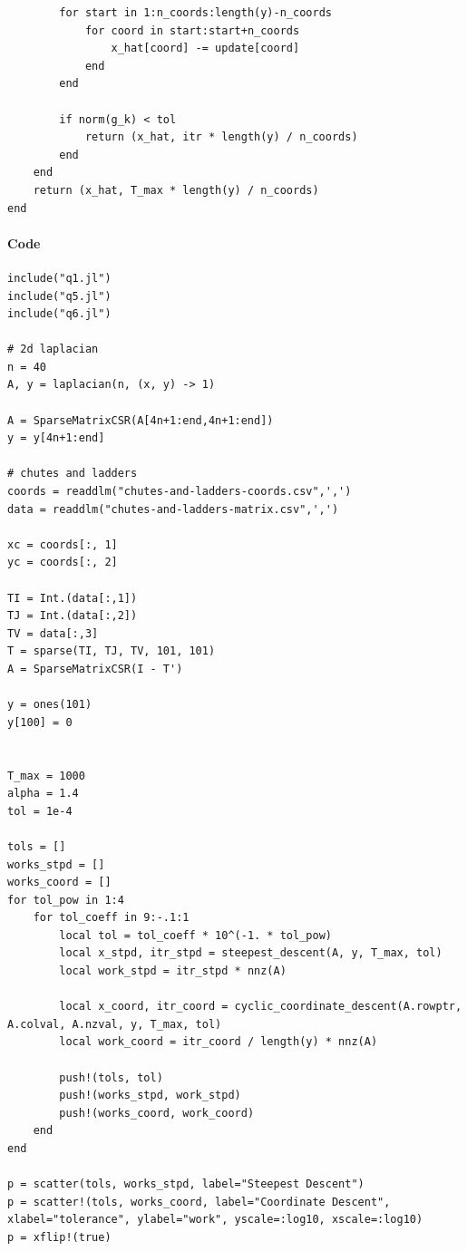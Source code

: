 \documentclass[]{exam}
\let\oldparagraph\paragraph
\renewcommand{\paragraph}[1]{\oldparagraph{#1}\mbox{}}
\begin{document}
\begin{questions}
\begin{lstlisting}
		for start in 1:n_coords:length(y)-n_coords
			for coord in start:start+n_coords
				x_hat[coord] -= update[coord]
			end
		end

		if norm(g_k) < tol
			return (x_hat, itr * length(y) / n_coords)
		end
	end
	return (x_hat, T_max * length(y) / n_coords)
end
\end{lstlisting}

\newpage
\question
\hfill

\paragraph{Code}
\begin{lstlisting}
include("q1.jl")
include("q5.jl")
include("q6.jl")

# 2d laplacian
n = 40
A, y = laplacian(n, (x, y) -> 1)

A = SparseMatrixCSR(A[4n+1:end,4n+1:end])
y = y[4n+1:end]

# chutes and ladders
coords = readdlm("chutes-and-ladders-coords.csv",',')
data = readdlm("chutes-and-ladders-matrix.csv",',')

xc = coords[:, 1]
yc = coords[:, 2]

TI = Int.(data[:,1])
TJ = Int.(data[:,2])
TV = data[:,3]
T = sparse(TI, TJ, TV, 101, 101)
A = SparseMatrixCSR(I - T')

y = ones(101)
y[100] = 0


T_max = 1000
alpha = 1.4
tol = 1e-4

tols = []
works_stpd = []
works_coord = []
for tol_pow in 1:4
	for tol_coeff in 9:-.1:1
		local tol = tol_coeff * 10^(-1. * tol_pow)
		local x_stpd, itr_stpd = steepest_descent(A, y, T_max, tol)
		local work_stpd = itr_stpd * nnz(A)

		local x_coord, itr_coord = cyclic_coordinate_descent(A.rowptr, A.colval, A.nzval, y, T_max, tol)
		local work_coord = itr_coord / length(y) * nnz(A)

		push!(tols, tol)
		push!(works_stpd, work_stpd)
		push!(works_coord, work_coord)
	end
end

p = scatter(tols, works_stpd, label="Steepest Descent")
p = scatter!(tols, works_coord, label="Coordinate Descent", xlabel="tolerance", ylabel="work", yscale=:log10, xscale=:log10)
p = xflip!(true)
\end{lstlisting}


\end{questions}
\end{document}
